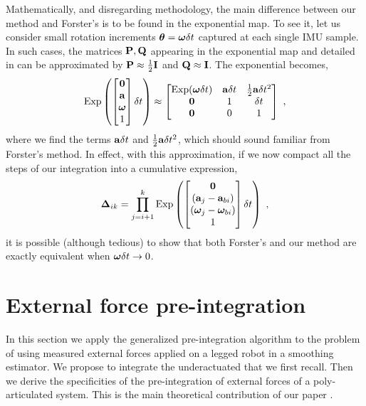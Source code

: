 Mathematically, and disregarding methodology, the main difference between our method and Forster's \cite{forster2017-TRO} is to be found in the exponential map. 
To see it, let us consider small rotation increments ${{\bm \theta}}={{\bm \omega}}\delta t$ captured at each single IMU sample. 
In such cases, the matrices ${\bf P},{\bf Q}$ appearing in the exponential map  and detailed in  can be approximated by ${\bf P}\approx\tfrac12{\bf I}$ and ${\bf Q}\approx{\bf I}$.
The exponential becomes,
%
\begin{align}
    \operatorname*{Exp}\left(\begin{bmatrix}
    \bf0 \\ {\bf a} \\ {{\bm \omega}} \\ 1
    \end{bmatrix}\delta t\right) \approx \begin{bmatrix}
    \operatorname*{Exp}({{\bm \omega}}\delta t) & {\bf a}\delta t & \tfrac12{\bf a}\delta t^2 \\
    \bf0 & 1 & \delta t \\
    \bf0 & 0 & 1
    \end{bmatrix}
~,
\end{align}
%
where we find the terms ${\bf a}\delta t$ and $\tfrac12{\bf a}\delta t^2$, which should sound familiar from Forster's method. 
In effect, with this approximation, if we now compact all the steps  of our integration into a cumulative expression,
%
\begin{align}
    {{\bm \Delta}}_{ik} = \prod_{j=i+1}^k \operatorname*{Exp}\left(\begin{bmatrix}
    \bf0 \\ ({\bf a}_j-{\bf a}_{bi}) \\ ({{\bm \omega}}_j-{{\bm \omega}}_{bi}) \\ 1
    \end{bmatrix}\delta t\right)
~,
\end{align}
%
it is possible (although tedious) to show that both Forster's and our method are exactly equivalent when ${{\bm \omega}}\delta t\to0$.









\section{External force pre-integration}
In this section we apply the generalized pre-integration algorithm to the problem of using measured external
forces applied on a legged robot in a smoothing estimator. We propose to integrate the underactuated that we first recall. Then 
we derive the specificities of the pre-integration of external forces of a poly-articulated system. This is the main theoretical contribution
of our paper \cite{fourmy2021contact}.


